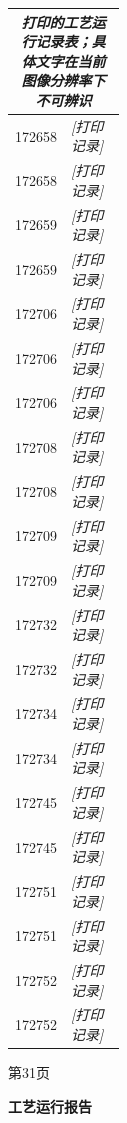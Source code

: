 \documentclass[UTF8,10pt,a4paper,fontset=fandol]{ctexart}
\begin{document}
\begin{center}
\begin{minipage}[t]{0.47\textwidth}
\small
\begin{tabularx}{\linewidth}{|p{0.22\linewidth}|X|}
\hline
\multicolumn{2}{|c|}{\textit{打印的工艺运行记录表；具体文字在当前图像分辨率下不可辨识}}\\
\hline
172658 & \textit{[打印记录]}\\ \hline
172658 & \textit{[打印记录]}\\ \hline
172659 & \textit{[打印记录]}\\ \hline
172659 & \textit{[打印记录]}\\ \hline
172706 & \textit{[打印记录]}\\ \hline
172706 & \textit{[打印记录]}\\ \hline
172706 & \textit{[打印记录]}\\ \hline
172708 & \textit{[打印记录]}\\ \hline
172708 & \textit{[打印记录]}\\ \hline
172709 & \textit{[打印记录]}\\ \hline
172709 & \textit{[打印记录]}\\ \hline
172732 & \textit{[打印记录]}\\ \hline
172732 & \textit{[打印记录]}\\ \hline
172734 & \textit{[打印记录]}\\ \hline
172734 & \textit{[打印记录]}\\ \hline
172745 & \textit{[打印记录]}\\ \hline
172745 & \textit{[打印记录]}\\ \hline
172751 & \textit{[打印记录]}\\ \hline
172751 & \textit{[打印记录]}\\ \hline
172752 & \textit{[打印记录]}\\ \hline
172752 & \textit{[打印记录]}\\ \hline
\end{tabularx}

\vspace{1mm}
第31页
\end{minipage}
\hfill
\begin{minipage}[t]{0.47\textwidth}
\centering
\textbf{工艺运行报告}


\end{minipage}
\end{center}
\end{document}
